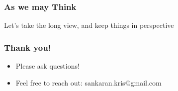 \documentclass[10pt,mathserif]{beamer}
\begin{document}
\begin{frame}
  \frametitle{As we may Think}
  Let's take the long view, and keep things in perspective
\end{frame}

\begin{frame}
  \frametitle{Thank you!}
  \begin{itemize}
  \item Please ask questions!
  \item Feel free to reach out: sankaran.kris@gmail.com
  \end{itemize}
\end{frame}

\begin{frame}[allowframebreaks]
  
  
\end{frame}
\end{document}
